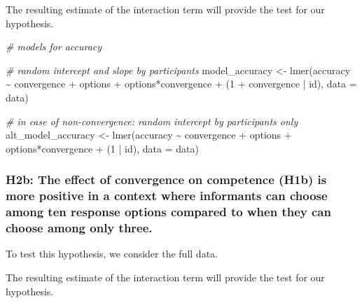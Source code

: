\documentclass[
]{article}
\newenvironment{Shaded}{\begin{snugshade}}{\end{snugshade}}
\newcommand{\AttributeTok}[1]{\textcolor[rgb]{0.77,0.63,0.00}{#1}}
\newcommand{\CommentTok}[1]{\textcolor[rgb]{0.56,0.35,0.01}{\textit{#1}}}
\newcommand{\DecValTok}[1]{\textcolor[rgb]{0.00,0.00,0.81}{#1}}
\newcommand{\FunctionTok}[1]{\textcolor[rgb]{0.00,0.00,0.00}{#1}}
\newcommand{\NormalTok}[1]{#1}
\newcommand{\OtherTok}[1]{\textcolor[rgb]{0.56,0.35,0.01}{#1}}
\newcommand{\SpecialCharTok}[1]{\textcolor[rgb]{0.00,0.00,0.00}{#1}}
\begin{document}
The resulting estimate of the interaction term will provide the test for
our hypothesis.

\begin{Shaded}
\begin{Highlighting}[]
\CommentTok{\# models for accuracy}

\CommentTok{\# random intercept and slope by participants}
\NormalTok{model\_accuracy }\OtherTok{\textless{}{-}} \FunctionTok{lmer}\NormalTok{(accuracy }\SpecialCharTok{\textasciitilde{}}\NormalTok{ convergence }\SpecialCharTok{+}\NormalTok{ options }\SpecialCharTok{+} 
\NormalTok{                            options}\SpecialCharTok{*}\NormalTok{convergence }\SpecialCharTok{+}\NormalTok{ (}\DecValTok{1} \SpecialCharTok{+}\NormalTok{ convergence }\SpecialCharTok{|}\NormalTok{ id), }
                       \AttributeTok{data =}\NormalTok{ data)}

\CommentTok{\# in case of non{-}convergence: random intercept by participants only}
\NormalTok{alt\_model\_accuracy }\OtherTok{\textless{}{-}} \FunctionTok{lmer}\NormalTok{(accuracy }\SpecialCharTok{\textasciitilde{}}\NormalTok{ convergence }\SpecialCharTok{+}\NormalTok{ options }\SpecialCharTok{+} 
\NormalTok{                            options}\SpecialCharTok{*}\NormalTok{convergence }\SpecialCharTok{+}\NormalTok{ (}\DecValTok{1} \SpecialCharTok{|}\NormalTok{ id), }
                           \AttributeTok{data =}\NormalTok{ data)}
\end{Highlighting}
\end{Shaded}

\hypertarget{h2b-the-effect-of-convergence-on-competence-h1b-is-more-positive-in-a-context-where-informants-can-choose-among-ten-response-options-compared-to-when-they-can-choose-among-only-three.}{%
\subsubsection{H2b: The effect of convergence on competence (H1b) is
more positive in a context where informants can choose among ten
response options compared to when they can choose among only
three.}\label{h2b-the-effect-of-convergence-on-competence-h1b-is-more-positive-in-a-context-where-informants-can-choose-among-ten-response-options-compared-to-when-they-can-choose-among-only-three.}}

To test this hypothesis, we consider the full data.

The resulting estimate of the interaction term will provide the test for
our hypothesis.
\end{document}
